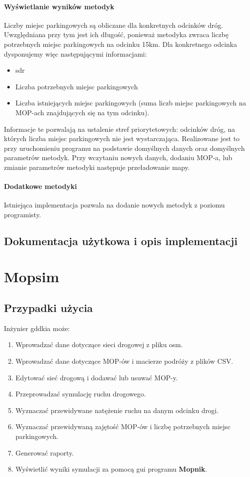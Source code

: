 \subsubsection{Wyświetlanie wyników metodyk}
Liczby miejsc parkingowych są obliczane dla konkretnych odcinków dróg.
Uwzględniana przy tym jest ich długość, ponieważ metodyka zwraca liczbę
potrzebnych miejsc parkingowych na odcinku 15km. Dla konkretnego odcinka
dysponujemy więc następującymi informacjami: 
\begin{itemize}
  \item \acrshort{sdr}
  \item Liczba potrzebnych miejsc parkingowych
  \item Liczba istniejących miejsc parkingowych (suma liczb miejsc
    parkingowych na MOP-ach znajdujących się na tym odcinku).
\end{itemize}
Informacje te pozwalają na ustalenie stref priorytetowych: odcinków dróg, na
których liczba miejsc parkingowych nie jest wystarczająca. Realizowane jest to
przy uruchomieniu programu na podstawie domyślnych danych oraz domyślnych
parametrów metodyk. Przy wczytaniu nowych danych,
dodaniu MOP-a, lub zmianie parametrów metodyki następuje przeładowanie mapy. 

\subsubsection{Dodatkowe metodyki} 
Istniejąca implementacja pozwala na dodanie nowych metodyk z poziomu
programisty.

\section{Dokumentacja użytkowa i opis implementacji}

\chapter{Mopsim}\label{r:Mopsim}

\section{Przypadki użycia}
Inżynier \acrshort{gddkia} może:
\begin{enumerate}
  \item Wprowadzać dane dotyczące sieci drogowej z pliku osm.
  \item Wprowadzać dane dotyczące MOP-ów i macierze podróży z plików CSV.
  \item Edytować sieć drogową i dodawać lub usuwać MOP-y.
  \item Przeprowadzać symulację ruchu drogowego.
  \item Wyznaczać przewidywane natężenie ruchu na danym odcinku drogi.
  \item Wyznaczać przewidywaną zajętość MOP-ów i liczbę potrzebnych miejsc parkingowych.
  \item Generować raporty.
  \item Wyświetlić wyniki symulacji za pomocą \acrshort{gui} programu \textbf{Mopnik}.
\end{enumerate}

